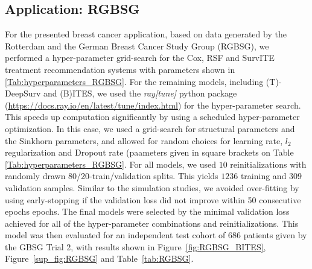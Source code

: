\documentclass{article}
\begin{document}
	\subsection{Application: RGBSG}
		For the presented breast cancer application, based on data generated by the Rotterdam and the German Breast Cancer Study Group (RGBSG), we performed a hyper-parameter grid-search for the Cox, RSF and SurvITE treatment recommendation systems with parameters shown in \ref{Tab:hyperparameters_RGBSG}.
		For the remaining models, including (T)-DeepSurv and (B)ITES, we used the \textit{ray[tune]} python package (\url{https://docs.ray.io/en/latest/tune/index.html}) for the hyper-parameter search. This speeds up computation significantly by using a scheduled hyper-parameter optimization. In this case, we used a grid-search for structural parameters and the Sinkhorn parameters, and allowed for random choices for learning rate, $l_2$ regularization and Dropout rate (paameters given in square brackets on Table \ref{Tab:hyperparameters_RGBSG}. For all models, we used $10$ reinitializations with randomly drawn 80/20-train/validation splits. This yields $1236$ training and $309$ validation samples. Similar to the simulation studies, we avoided over-fitting by using early-stopping if the validation loss did not improve within 50 consecutive epochs epochs. The final models were selected by the minimal validation loss achieved for all of the hyper-parameter combinations and reinitializations. This model was then evaluated for an independent test cohort of $686$ patients given by the GBSG Trial 2, with results shown in Figure~\ref{fig:RGBSG_BITES}, Figure~\ref{sup_fig:RGBSG} and Table~\ref{tab:RGBSG}.
\end{document}
